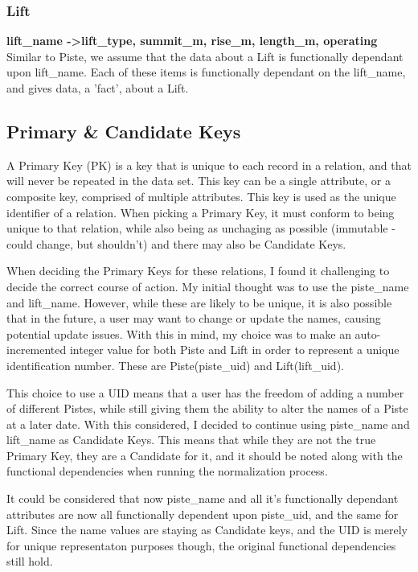 \documentclass[11pt]{scrartcl} %
\begin{document}
\subsubsection{Lift}
\textbf{lift\_name -\textgreater  lift\_type, summit\_m, rise\_m, length\_m, operating}
\\[0.2cm]
Similar to Piste, we assume that the data about a Lift is functionally dependant upon lift\_name. Each of these items is functionally dependant on the lift\_name, and gives data, a 'fact', about a Lift.

\subsection{Primary \& Candidate Keys}
A Primary Key (PK) is a key that is unique to each record in a relation, and that will never be repeated in the data set. This key can be a single attribute, or a composite key, comprised of multiple attributes. This key is used as the unique identifier of a relation. When picking a Primary Key, it must conform to being unique to that relation, while also being as unchaging as possible (immutable - could change, but shouldn't) and there may also be Candidate Keys.

When deciding the Primary Keys for these relations, I found it challenging to decide the correct course of action. My initial thought was to use the piste\_name and lift\_name. However, while these are likely to be unique, it is also possible that in the future, a user may want to change or update the names, causing potential update issues. With this in mind, my choice was to make an auto-incremented integer value for both Piste and Lift in order to represent a unique identification number. These are Piste(piste\_uid) and Lift(lift\_uid).

This choice to use a UID means that a user has the freedom of adding a number of different Pistes, while still giving them the ability to alter the names of a Piste at a later date. With this considered, I decided to continue using piste\_name and lift\_name as Candidate Keys. This means that while they are not the true Primary Key, they are a Candidate for it, and it should be noted along with the functional dependencies when running the normalization process.

 It could be considered that now piste\_name and all it's functionally dependant attributes are now all functionally dependent upon piste\_uid, and the same for Lift. Since the name values are staying as Candidate keys, and the UID is merely for unique representaton purposes though, the original functional dependencies still hold.
\end{document}
